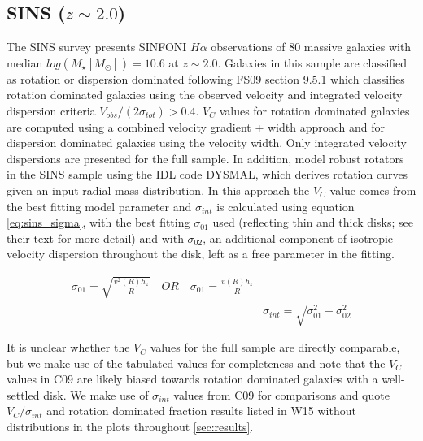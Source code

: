 \documentclass[fleqn,usenatbib]{mn2e}
\begin{document}
\subsection{SINS ($z\sim2.0$)}\label{subsec:SINS}
The SINS survey \citep[FS09]{ForsterSchreiber2009} presents SINFONI $H\alpha$ observations of 80 massive galaxies with median $log(M_{\star}[M_{\odot}])=10.6$ at $z\sim2.0$.
Galaxies in this sample are classified as rotation or dispersion dominated following FS09 section 9.5.1 which classifies rotation dominated galaxies using the observed velocity and integrated velocity dispersion criteria $V_{obs}/(2\sigma_{tot}) > 0.4$.
$V_{C}$ values for rotation dominated galaxies are computed using a combined velocity gradient + width approach \citep{ForsterSchreiber2006} and for dispersion dominated galaxies using the velocity width.
Only integrated velocity dispersions are presented for the full sample.
In addition, \cite[C09]{Cresci2009} model robust rotators in the SINS sample using the IDL code DYSMAL, which derives rotation curves given an input radial mass distribution.
In this approach the $V_{C}$ value comes from the best fitting model parameter and $\sigma_{int}$ is calculated using equation \ref{eq:sins_sigma}, with the best fitting $\sigma_{01}$ used (reflecting thin and thick disks; see their text for more detail) and with $\sigma_{02}$, an additional component of isotropic velocity dispersion throughout the disk, left as a free parameter in the fitting.

\begin{equation}\label{eq:sins_sigma}
\begin{split}
\sigma_{01} = \sqrt{\frac{v^{2}(R)h_{z}}{R}} \quad OR \quad \sigma_{01} = \frac{v(R)h_{z}}{R} \\
& \sigma_{int} = \sqrt{\sigma_{01}^{2} + \sigma_{02}^{2}}
\end{split}
\end{equation}

It is unclear whether the $V_{C}$ values for the full sample are directly comparable, but we make use of the tabulated values for completeness and note that the $V_{C}$ values in C09 are likely biased towards rotation dominated galaxies with a well-settled disk.
We make use of $\sigma_{int}$ values from C09 for comparisons and quote $V_{C}/\sigma_{int}$ and rotation dominated fraction results listed in W15 without distributions in the plots throughout \cref{sec:results}.
\end{document}
